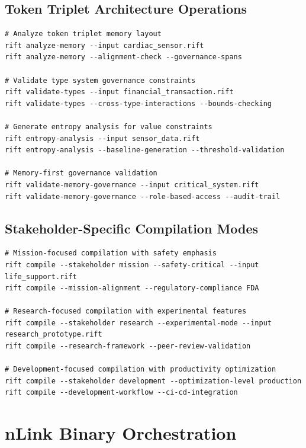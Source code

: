 \documentclass[11pt,letterpaper]{article}
\begin{document}
\subsection{Token Triplet Architecture Operations}

\begin{lstlisting}[language=shell, caption=Token Architecture Commands]
# Analyze token triplet memory layout
rift analyze-memory --input cardiac_sensor.rift
rift analyze-memory --alignment-check --governance-spans

# Validate type system governance constraints
rift validate-types --input financial_transaction.rift
rift validate-types --cross-type-interactions --bounds-checking

# Generate entropy analysis for value constraints
rift entropy-analysis --input sensor_data.rift
rift entropy-analysis --baseline-generation --threshold-validation

# Memory-first governance validation
rift validate-memory-governance --input critical_system.rift
rift validate-memory-governance --role-based-access --audit-trail
\end{lstlisting}

\subsection{Stakeholder-Specific Compilation Modes}

\begin{lstlisting}[language=shell, caption=Stakeholder-Aligned Compilation]
# Mission-focused compilation with safety emphasis
rift compile --stakeholder mission --safety-critical --input life_support.rift
rift compile --mission-alignment --regulatory-compliance FDA

# Research-focused compilation with experimental features
rift compile --stakeholder research --experimental-mode --input research_prototype.rift
rift compile --research-framework --peer-review-validation

# Development-focused compilation with productivity optimization
rift compile --stakeholder development --optimization-level production
rift compile --development-workflow --ci-cd-integration
\end{lstlisting}

\section{nLink Binary Orchestration}
\end{document}
